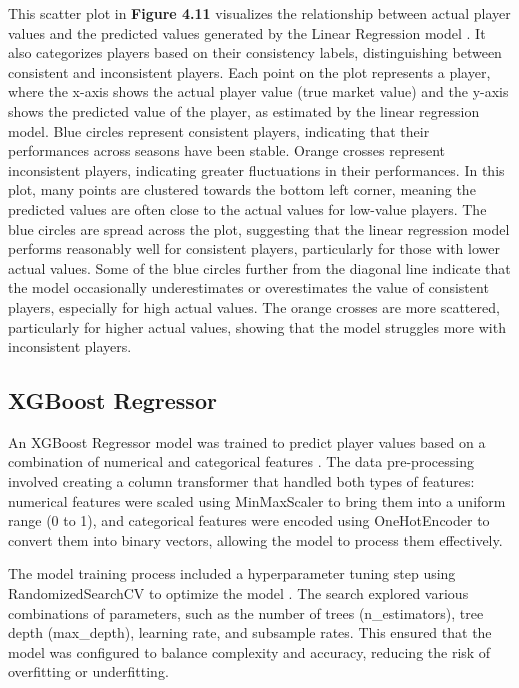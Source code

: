 \documentclass[12pt, a4paper,oneside]{book}
\numberwithin{equation}{section}
\begin{document}
This scatter plot in \textbf{Figure 4.11} visualizes the relationship between actual player values and the predicted values generated by the Linear Regression model \cite{Abhigyan2020}. It also categorizes players based on their consistency labels, distinguishing between consistent and inconsistent players. Each point on the plot represents a player, where the x-axis shows the actual player value (true market value) and the y-axis shows the predicted value of the player, as estimated by the linear regression model. Blue circles represent consistent players, indicating that their performances across seasons have been stable. Orange crosses represent inconsistent players, indicating greater fluctuations in their performances. In this plot, many points are clustered towards the bottom left corner, meaning the predicted values are often close to the actual values for low-value players. The blue circles are spread across the plot, suggesting that the linear regression model performs reasonably well for consistent players, particularly for those with lower actual values. Some of the blue circles further from the diagonal line indicate that the model occasionally underestimates or overestimates the value of consistent players, especially for high actual values. The orange crosses are more scattered, particularly for higher actual values, showing that the model struggles more with inconsistent players.

\subsection{XGBoost Regressor}\label{sec:4.5.2}

An XGBoost Regressor model was trained to predict player values based on a combination of numerical and categorical features \cite{chen2016} \cite{Kaggle2021}. The data pre-processing involved creating a column transformer that handled both types of features: numerical features were scaled using MinMaxScaler to bring them into a uniform range (0 to 1), and categorical features were encoded using OneHotEncoder to convert them into binary vectors, allowing the model to process them effectively.

The model training process included a hyperparameter tuning step using RandomizedSearchCV to optimize the model \cite{friedman2001}. The search explored various combinations of parameters, such as the number of trees (n\_estimators), tree depth (max\_depth), learning rate, and subsample rates. This ensured that the model was configured to balance complexity and accuracy, reducing the risk of overfitting or underfitting.
\end{document}
